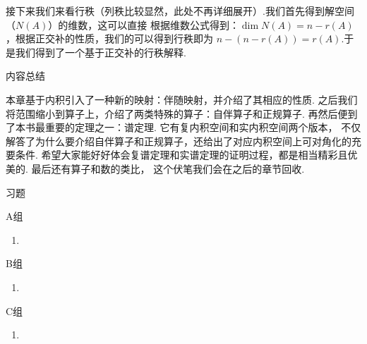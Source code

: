接下来我们来看行秩（列秩比较显然，此处不再详细展开）.我们首先得到解空间（$N(A)$）的维数，这可以直接
根据维数公式得到：$\dim N(A) =n-r(A)$，根据正交补的性质，我们的可以得到行秩即为
$n-(n-r(A))=r(A)$.于是我们得到了一个基于正交补的行秩解释.

\vspace{2ex}
\centerline{\heiti \Large 内容总结}
    本章基于内积引入了一种新的映射：伴随映射，并介绍了其相应的性质. 
    之后我们将范围缩小到算子上，介绍了两类特殊的算子：自伴算子和正规算子. 
    再然后便到了本书最重要的定理之一：谱定理. 它有复内积空间和实内积空间两个版本，
    不仅解答了为什么要介绍自伴算子和正规算子，还给出了对应内积空间上可对角化的充要条件. 
    希望大家能好好体会复谱定理和实谱定理的证明过程，都是相当精彩且优美的. 最后还有算子和数的类比，
    这个伏笔我们会在之后的章节回收. 
\vspace{2ex}

\centerline{\heiti \Large 习题}
\vspace{2ex}
{\kaishu }
\begin{flushright}
    \kaishu

\end{flushright}
\centerline{\heiti A组}
\begin{enumerate}
    \item
\end{enumerate}
\centerline{\heiti B组}
\begin{enumerate}
    \item
\end{enumerate}
\centerline{\heiti C组}
\begin{enumerate}
    \item
\end{enumerate}